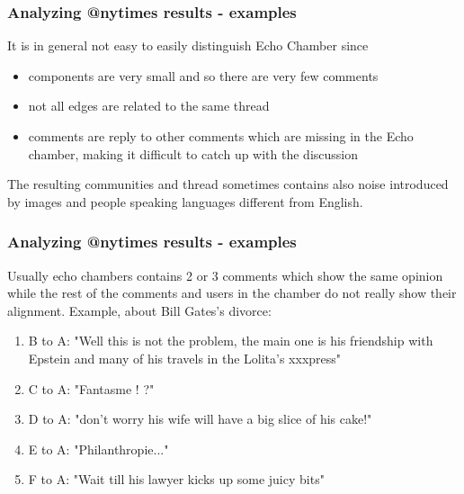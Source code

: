 \documentclass{beamer}
\begin{document}
\begin{frame}[c]
	\frametitle{Analyzing @nytimes results - examples}
	It is in general not easy to easily distinguish Echo Chamber since
	\begin{itemize}
		\item components are very small and so there are very few comments
		\item not all edges are related to the same thread
		\item comments are reply to other comments which are missing in the
		      Echo chamber, making it difficult to catch up with the discussion
	\end{itemize}

	The resulting communities and thread sometimes contains also noise
	introduced by images and people speaking languages different from English.
\end{frame}

\begin{frame}[c]
	\frametitle{Analyzing @nytimes results - examples}
	Usually echo chambers contains 2 or 3 comments which show the same opinion
	while the rest of the comments and users in the chamber do not really show
	their alignment. Example, about Bill Gates's divorce:

	\begin{enumerate}
		\item B to A: "Well this is not the problem, the main one is his
		      friendship with Epstein and many of his travels in the Lolita's
		      xxxpress"
		\item C to A: "Fantasme ! ?"

		\item D to A: "don't worry his wife will have a big slice of his cake!"
		\item E to A: "Philanthropie..."
		\item F to A: "Wait till his lawyer kicks up some juicy bits"
	\end{enumerate}
\end{frame}
\end{document}
